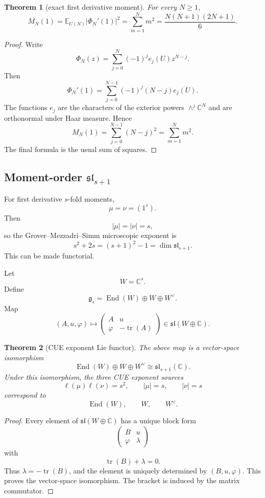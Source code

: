 \documentclass[11pt]{article}
\newtheorem{theorem}{Theorem}[section]
\theoremstyle{remark}
\DeclareMathOperator{\End}{End}
\DeclareMathOperator{\tr}{tr}
\newcommand{\CC}{\mathbb C}
\begin{document}
\begin{theorem}[exact first derivative moment]
For every $N\ge1$,
\[
        M_N(1)=\mathbb E_{U(N)}|\Phi_N'(1)|^2
        =\sum_{m=1}^Nm^2
        =\frac{N(N+1)(2N+1)}6.
\]
\end{theorem}

\begin{proof}
Write
\[
        \Phi_N(z)=\sum_{j=0}^N(-1)^j e_j(U)z^{N-j}.
\]
Then
\[
        \Phi_N'(1)=\sum_{j=0}^{N-1}(-1)^j(N-j)e_j(U).
\]
The functions $e_j$ are the characters of the exterior powers $\wedge^j\CC^N$ and are orthonormal under Haar measure.  Hence
\[
        M_N(1)=\sum_{j=0}^{N-1}(N-j)^2=\sum_{m=1}^Nm^2.
\]
The final formula is the usual sum of squares.\end{proof}

\subsection{Moment-order $\mathfrak{sl}_{s+1}$}

For first derivative $s$-fold moments,
\[
        \mu=\nu=(1^s).
\]
Then
\[
        |\mu|=|\nu|=s,
\]
so the Grover--Mezzadri--Simm microscopic exponent is
\[
        s^2+2s=(s+1)^2-1=\dim\mathfrak{sl}_{s+1}.
\]
This can be made functorial.

Let
\[
        W=\CC^s.
\]
Define
\[
        \mathfrak g_s=\End(W)\oplus W\oplus W^\vee.
\]
Map
\[
        (A,u,\varphi)
        \longmapsto
        \begin{pmatrix}
        A&u\\
        \varphi&-\tr(A)
        \end{pmatrix}
        \in\mathfrak{sl}(W\oplus\CC).
\]

\begin{theorem}[CUE exponent Lie functor]
The above map is a vector-space isomorphism
\[
        \End(W)\oplus W\oplus W^\vee
        \cong
        \mathfrak{sl}_{s+1}(\CC).
\]
Under this isomorphism, the three CUE exponent sources
\[
        \ell(\mu)\ell(\nu)=s^2,
        \qquad
        |\mu|=s,
        \qquad
        |\nu|=s
\]
correspond to
\[
        \End(W),
        \qquad
        W,
        \qquad
        W^\vee.
\]
\end{theorem}

\begin{proof}
Every element of $\mathfrak{sl}(W\oplus\CC)$ has a unique block form
\[
        \begin{pmatrix}
        B&u\\
        \varphi&\lambda
        \end{pmatrix}
\]
with
\[
        \tr(B)+\lambda=0.
\]
Thus $\lambda=-\tr(B)$, and the element is uniquely determined by $(B,u,\varphi)$.  This proves the vector-space isomorphism.  The bracket is induced by the matrix commutator.\end{proof}
\end{document}
